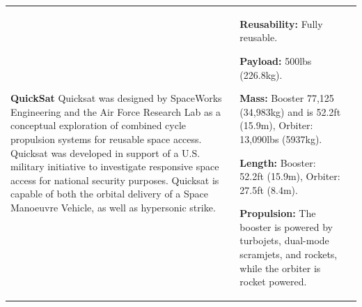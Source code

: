{\begin{landscape}
\begin{xltabular}{\linewidth}{|X|X|X|}
	\\
	\hline \small 
	\textbf{QuickSat}\cite{Eklund2012}\newline\newline
Quicksat was designed by SpaceWorks Engineering and the Air Force Research Lab as a conceptual exploration of combined cycle propulsion systems for reusable space access. Quicksat was developed in support of a U.S. military initiative to investigate responsive space access for national security purposes. Quicksat is capable of both the orbital delivery of a Space Manoeuvre Vehicle, as well as hypersonic strike. 
	&\small
	
	\textbf{Reusability:} Fully reusable. 
	
	\textbf{Payload:} 500lbs (226.8kg). 
	
	\textbf{Mass:} Booster 77,125 (34,983kg) and is 52.2ft (15.9m), Orbiter: 13,090lbs (5937kg).
	
	\textbf{Length:} Booster: 52.2ft (15.9m), Orbiter: 27.5ft (8.4m).
	
	\textbf{Propulsion:} The booster is powered by turbojets, dual-mode scramjets, and rockets, while the orbiter is rocket powered.
	
	&\small
	

\end{xltabular}
\end{landscape}}
